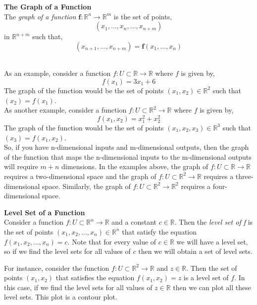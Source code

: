 \documentclass[12pt]{article}
\begin{document}
 \begin{framed}
 \textbf{The Graph of a Function}\\
  The \emph{graph of a function} $\mathbf{f}:\mathbb{R}^n\rightarrow\mathbb{R}^m$ is the set of points,
 \[
 (x_1, \ldots, x_{n},\ldots,x_{n+m})
 \]
 in $\mathbb{R}^{n+m}$ such that,
 \[
 (x_{n+1},\ldots,x_{n+m}) = \mathbf{f}(x_1, \ldots, x_n)
 \] \\
  \end{framed}
 
 As an example, consider a function $f:U\subset\mathbb{R}\rightarrow\mathbb{R}$ where $f$ is given by,
 \[
 f(x_1) = 3x_1 + 6  
 \]
  The graph of the function would be the set of points $(x_1,x_2)\in\mathbb{R}^2$ such that $(x_2) = f(x_1)$. \\
 
As another example, consider a function $f:U\subset\mathbb{R}^2\rightarrow\mathbb{R}$ where $f$ is given by,
\[
f(x_1,x_2) = x_1^2 + x_2^2
\]
The graph of the function would be the set of points $(x_1,x_2,x_3)\in\mathbb{R}^3$ such that $(x_3) = f(x_1,x_2)$. \\
 
So, if you have n-dimensional inputs and m-dimensional outputs, then the graph of the function that maps the n-dimensional inputs to the m-dimensional outputs will require $m+n$ dimensions. In the examples above, the graph of $f:U\subset\mathbb{R}\rightarrow\mathbb{R}$ requires a two-dimensional space and the graph of $f:U\subset\mathbb{R}^2\rightarrow\mathbb{R}$ requires a three-dimensional space. Similarly, the graph of $f:U\subset\mathbb{R}^2\rightarrow\mathbb{R}^2$ requires a four-dimensional space. \\

\begin{framed}
\textbf{Level Set of a Function} \\
Consider a function $f: U\subset\mathbb{R}^n\rightarrow\mathbb{R}$ and a constant $c\in\mathbb{R}$. Then the \emph{level set of f} is the set of points $(x_1,x_2,\ldots,x_n)\in\mathbb{R}^n$ that satisfy the equation $f(x_1,x_2,\ldots,x_n)=c$. Note that for every value of $c\in\mathbb{R}$ we will have a level set, so if we find the level sets for all values of $c$ then we will obtain a set of level sets. \\
\end{framed}

For instance, consider the function $f:U\subset\mathbb{R}^2\rightarrow\mathbb{R}$ and $z\in\mathbb{R}$. Then the set of points $(x_1,x_2)$ that satisfies the equation $f(x_1,x_2)=z$ is a level set of $f$. In this case, if we find the level sets for all values of $z\in\mathbb{R}$ then we can plot all these level sets. This plot is a contour plot. \\
\end{document}
